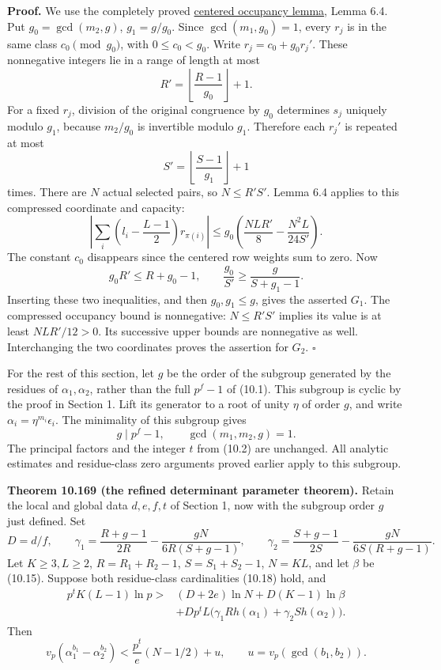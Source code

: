 \documentclass[
  11pt,
  a4paper,
]{article}
\begin{document}
\textbf{Proof.} We use the completely proved
\href{../TR-BAKER-06.html\#11-centering-the-exponents-the-occupancy-bound}{centered
occupancy lemma}, Lemma 6.4. Put \(g_0=\gcd(m_2,g)\), \(g_1=g/g_0\).
Since \(\gcd(m_1,g_0)=1\), every \(r_j\) is in the same class
\(c_0\pmod{g_0}\), with \(0\le c_0<g_0\). Write \(r_j=c_0+g_0r_j'\).
These nonnegative integers lie in a range of length at most \[
R'=\left\lfloor\frac{R-1}{g_0}\right\rfloor+1.
\tag{10.596}
\] For a fixed \(r_j\), division of the original congruence by \(g_0\)
determines \(s_j\) uniquely modulo \(g_1\), because \(m_2/g_0\) is
invertible modulo \(g_1\). Therefore each \(r_j'\) is repeated at most
\[
S'=\left\lfloor\frac{S-1}{g_1}\right\rfloor+1
\tag{10.597}
\] times. There are \(N\) actual selected pairs, so \(N\le R'S'\). Lemma
6.4 applies to this compressed coordinate and capacity: \[
\left|\sum_i\left(l_i-\frac{L-1}{2}\right)r_{\pi(i)}\right|
\le g_0\left(\frac{NLR'}8-\frac{N^2L}{24S'}\right).
\tag{10.598}
\] The constant \(c_0\) disappears since the centered row weights sum to
zero. Now \[
g_0R'\le R+g_0-1,\qquad
\frac{g_0}{S'}\ge\frac{g}{S+g_1-1}.
\tag{10.599}
\] Inserting these two inequalities, and then \(g_0,g_1\le g\), gives
the asserted \(G_1\). The compressed occupancy bound is nonnegative:
\(N\le R'S'\) implies its value is at least \(NLR'/12>0\). Its
successive upper bounds are nonnegative as well. Interchanging the two
coordinates proves the assertion for \(G_2\). \(\square\)

For the rest of this section, let \(g\) be the order of the subgroup
generated by the residues of \(\alpha_1,\alpha_2\), rather than the full
\(p^f-1\) of (10.1). This subgroup is cyclic by the proof in Section 1.
Lift its generator to a root of unity \(\eta\) of order \(g\), and write
\(\alpha_i=\eta^{m_i}\epsilon_i\). The minimality of this subgroup gives
\[
g\mid p^f-1,\qquad \gcd(m_1,m_2,g)=1.
\tag{10.600}
\] The principal factors and the integer \(t\) from (10.2) are
unchanged. All analytic estimates and residue-class zero arguments
proved earlier apply to this subgroup.

\textbf{Theorem 10.169 (the refined determinant parameter theorem).}
Retain the local and global data \(d,e,f,t\) of Section 1, now with the
subgroup order \(g\) just defined. Set \[
D=d/f,\qquad
\gamma_1=\frac{R+g-1}{2R}-\frac{gN}{6R(S+g-1)},\qquad
\gamma_2=\frac{S+g-1}{2S}-\frac{gN}{6S(R+g-1)}.
\tag{10.601}
\] Let \(K\ge3,L\ge2\), \(R=R_1+R_2-1\), \(S=S_1+S_2-1\), \(N=KL\), and
let \(\beta\) be (10.15). Suppose both residue-class cardinalities
(10.18) hold, and \[
\begin{aligned}
p^tK(L-1)\ln p>{}&(D+2e)\ln N+D(K-1)\ln\beta\\
&+Dp^tL\bigl(\gamma_1Rh(\alpha_1)+\gamma_2Sh(\alpha_2)\bigr).
\end{aligned}
\tag{10.602}
\] Then \[
v_p(\alpha_1^{b_1}-\alpha_2^{b_2})
<\frac{p^t}{e}(N-1/2)+u,
\qquad u=v_p(\gcd(b_1,b_2)).
\tag{10.603}
\]
\end{document}
